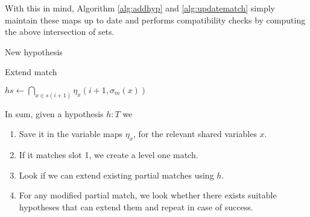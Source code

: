 \documentclass[runningheads]{llncs}
\begin{document}
With this in mind, Algorithm \ref{alg:addhyp} and \ref{alg:updatematch} simply maintain these maps up to date and performs compatibility checks by computing the above intersection of sets.

\begin{algorithm}
    \caption{New hypothesis}\label{alg:addhyp}
\end{algorithm}

\begin{algorithm}
    \caption{Extend match}\label{alg:updatematch}
        $hs \gets \bigcap_{x \in s(i + 1)} \eta_x \left(i + 1, \sigma_m(x)\right)$ \\
\end{algorithm}

In sum, given a hypothesis $h :T$ we
\begin{enumerate}
\item Save it in the variable maps $\eta_x$, for the relevant shared variables $x$.
\item If it matches slot 1, we create a level one match.
\item Look if we can extend existing partial matches using $h$.
\item For any modified partial match, we look whether there exists suitable hypotheses that can extend them and repeat in case of success.
\end{enumerate}
\end{document}
